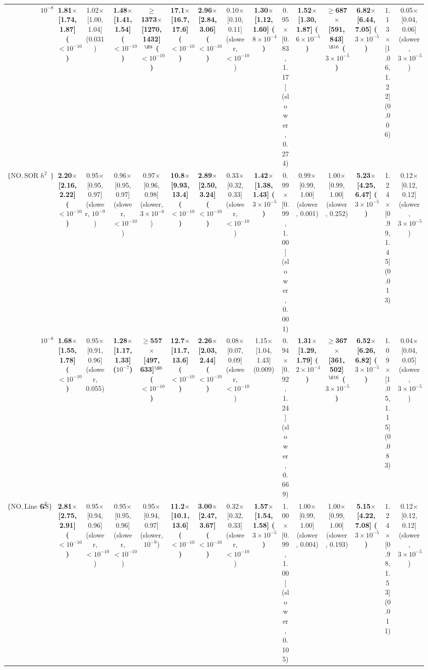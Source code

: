 {\begin{tabular}{llcccccccccccccc}
 & $10^{-8}$ & \textbf{1.81$\times$ [1.74, 1.87] ($<10^{-10}$)} & 1.02$\times$ [1.00, 1.04] (0.031) & \textbf{1.48$\times$ [1.41, 1.54] ($<10^{-10}$)} & \textbf{$\geq$1373$\times$ [1270, 1432]$^{\S 9}$ ($<10^{-10}$)} & \textbf{17.1$\times$ [16.7, 17.6] ($<10^{-10}$)} & \textbf{2.96$\times$ [2.84, 3.06] ($<10^{-10}$)} & 0.10$\times$ [0.10, 0.11] (slower, $<10^{-10}$) & \textbf{1.30$\times$ [1.12, 1.60] ($8\times10^{-4}$)} & 0.95$\times$ [0.83, 1.17] (slower, 0.274) & \textbf{1.52$\times$ [1.30, 1.87] ($6\times10^{-5}$)} & \textbf{$\geq$687$\times$ [591, 843]$^{\S 16}$ ($3\times10^{-5}$)} & \textbf{6.82$\times$ [6.44, 7.05] ($3\times10^{-5}$)} & 1.13$\times$ [1.06, 1.22] (0.006) & 0.05$\times$ [0.04, 0.06] (slower, $3\times10^{-5}$) \\
$\{\mathrm{NO}, \text{SOR (1.5)}\}$ & $h^2$ & \textbf{2.20$\times$ [2.16, 2.22] ($<10^{-10}$)} & 0.95$\times$ [0.95, 0.97] (slower, $10^{-9}$) & 0.96$\times$ [0.95, 0.97] (slower, $<10^{-10}$) & 0.97$\times$ [0.96, 0.98] (slower, $3\times10^{-6}$) & \textbf{10.8$\times$ [9.93, 13.4] ($<10^{-10}$)} & \textbf{2.89$\times$ [2.50, 3.24] ($<10^{-10}$)} & 0.33$\times$ [0.32, 0.33] (slower, $<10^{-10}$) & \textbf{1.42$\times$ [1.38, 1.43] ($3\times10^{-5}$)} & 0.99$\times$ [0.99, 1.00] (slower, 0.001) & 0.99$\times$ [0.99, 1.00] (slower, 0.001) & 1.00$\times$ [0.99, 1.00] (slower, 0.252) & \textbf{5.23$\times$ [4.25, 6.47] ($3\times10^{-5}$)} & 1.24$\times$ [0.99, 1.45] (0.013) & 0.12$\times$ [0.12, 0.12] (slower, $3\times10^{-5}$) \\
 & $10^{-8}$ & \textbf{1.68$\times$ [1.55, 1.78] ($<10^{-10}$)} & 0.95$\times$ [0.91, 0.96] (slower, 0.055) & \textbf{1.28$\times$ [1.17, 1.33] ($10^{-7}$)} & \textbf{$\geq$557$\times$ [497, 633]$^{\S 6}$ ($<10^{-10}$)} & \textbf{12.7$\times$ [11.7, 13.6] ($<10^{-10}$)} & \textbf{2.26$\times$ [2.03, 2.44] ($<10^{-10}$)} & 0.08$\times$ [0.07, 0.09] (slower, $<10^{-10}$) & 1.15$\times$ [1.04, 1.43] (0.009) & 0.94$\times$ [0.92, 1.24] (slower, 0.669) & \textbf{1.31$\times$ [1.29, 1.79] ($2\times10^{-4}$)} & \textbf{$\geq$367$\times$ [361, 502]$^{\S 16}$ ($3\times10^{-5}$)} & \textbf{6.52$\times$ [6.26, 6.82] ($3\times10^{-5}$)} & 1.09$\times$ [1.05, 1.15] (0.083) & 0.04$\times$ [0.04, 0.05] (slower, $3\times10^{-5}$) \\
$\{\mathrm{NO}, \text{Line GS}\}$ & $h^2$ & \textbf{2.81$\times$ [2.75, 2.91] ($<10^{-10}$)} & 0.95$\times$ [0.94, 0.96] (slower, $<10^{-10}$) & 0.95$\times$ [0.95, 0.96] (slower, $<10^{-10}$) & 0.95$\times$ [0.94, 0.97] (slower, $10^{-9}$) & \textbf{11.2$\times$ [10.1, 13.6] ($<10^{-10}$)} & \textbf{3.00$\times$ [2.47, 3.67] ($<10^{-10}$)} & 0.32$\times$ [0.32, 0.33] (slower, $<10^{-10}$) & \textbf{1.57$\times$ [1.54, 1.58] ($3\times10^{-5}$)} & 1.00$\times$ [0.99, 1.00] (slower, 0.105) & 1.00$\times$ [0.99, 1.00] (slower, 0.004) & 1.00$\times$ [0.99, 1.00] (slower, 0.193) & \textbf{5.15$\times$ [4.22, 7.08] ($3\times10^{-5}$)} & 1.24$\times$ [0.98, 1.53] (0.011) & 0.12$\times$ [0.12, 0.12] (slower, $3\times10^{-5}$) \\

\end{tabular}}
